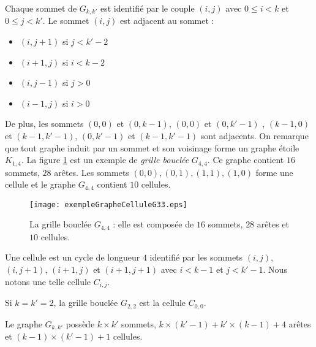 Chaque sommet de $G_{k,k'}$ est identifi\'e par le couple $(i,j)$ avec $0 \le i < k$ et $0 \le j < k'$. Le sommet $(i,j)$ est adjacent  au sommet :
\begin{itemize}
	\item $(i, j+1)$ si $j < k'-2$
	\item $(i+1,j)$ si $i < k-2$
	\item $(i,j-1)$ si $j > 0$
	\item $(i-1,j)$ si $i > 0$
\end{itemize}
De plus, les sommets  $(0,0)$ et $(0,k-1)$,  $(0,0)$ et $(0,k'-1)$ , $(k-1,0)$ et $(k-1,k'-1)$, $(0,k'-1)$ et $(k-1,k'-1)$ sont adjacents.
On remarque que tout graphe  induit par un sommet et son voisinage forme un graphe \'etoile $K_{1,4}$.
La figure \ref{exempleGrapheCellule} est un exemple de {\em grille boucl\'ee} $G_{4,4}$. Ce graphe contient $16$ sommets, $28$ ar\^etes. Les sommets $(0,0), (0,1), (1,1), (1,0)$ forme une cellule et le graphe $G_{4,4}$ contient  $10$ cellules. 
\begin{figure}[htb!] 
\centering
\texttt{[image: exempleGrapheCelluleG33.eps]}
\caption{ La grille boucl\'ee $G_{4,4}$ : elle est compos\'ee de $16$ sommets, $28$ ar\^etes et $10$ cellules. }
\label{exempleGrapheCellule} 
\end{figure}
\begin{definition}
Une cellule est un cycle de longueur $4$ identifi\'e par les sommets $(i,j)$, $(i,j+1)$, $(i+1,j)$ et $(i+1,j+1)$ avec $i<k-1$ et $j<k'-1$. Nous notons une telle cellule $C_{i,j}$.
\end{definition}
Si $k = k' = 2$, la grille boucl\'ee $G_{2,2}$ est la cellule $C_{0,0}$.

\begin{property}
Le graphe $G_{k,k'}$ poss\`ede $k \times k'$ sommets,  $k \times (k'-1) + k' \times(k-1) + 4$  ar\^etes et $(k-1) \times (k'-1) +1$ cellules.
\end{property}
